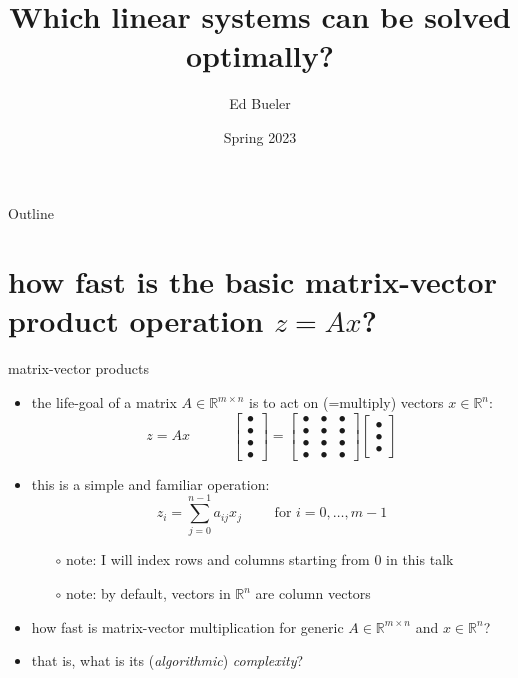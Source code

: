 \documentclass[10pt,
               svgnames,
               hyperref={colorlinks,citecolor=DeepPink4,linkcolor=FireBrick,urlcolor=Maroon},
               usepdftitle=false]{beamer}
\title{Which linear systems can be solved optimally?}
\author{Ed Bueler}
\institute[]{UAF Math 692 Scalable Seminar}
\date{Spring 2023}
\newcommand{\RR}{\mathbb{R}}
\begin{document}
\beamertemplatenavigationsymbolsempty

\begin{frame}
  \maketitle
\end{frame}

\begin{frame}{Outline}
  \tableofcontents[hideallsubsections]
\end{frame}

\section{how fast is the basic matrix-vector product operation $z=Ax$?}

\newcommand{\bulletax}{\begin{bmatrix} \bullet \\ \bullet \\ \bullet \\ \bullet \end{bmatrix} = \begin{bmatrix} \bullet & \bullet & \bullet \\ \bullet & \bullet & \bullet \\ \bullet & \bullet & \bullet \\ \bullet & \bullet & \bullet \end{bmatrix} \begin{bmatrix} \bullet \\ \bullet \\ \bullet \end{bmatrix}}

\begin{frame}{matrix-vector products}
\begin{itemize}
\item the life-goal of a matrix $A \in \RR^{m\times n}$ is to act on (=multiply) vectors $x \in \RR^n$:
    $$z = Ax \qquad\quad \bulletax$$
\item this is a simple and familiar operation:
    $$z_i = \sum_{j=0}^{n-1} a_{ij} x_j \qquad \text{ for } i=0,\dots,m-1$$

    \begin{itemize}
    \item[$\circ$] note: I will index rows and columns starting from 0 in this talk
    \item[$\circ$] note: by default, vectors in $\RR^n$ are column vectors
    \end{itemize}

\medskip
\item how fast is matrix-vector multiplication for generic $A \in \RR^{m\times n}$ and $x \in \RR^n$?

\medskip
\item that is, what is its (\emph{algorithmic}) \emph{complexity}?
\end{itemize}
\end{frame}
\end{document}
